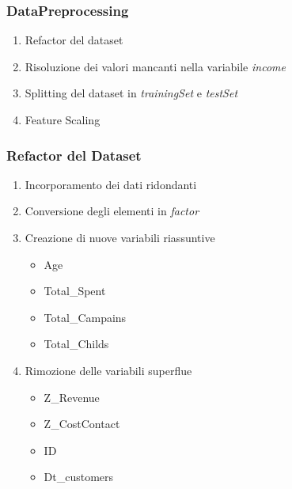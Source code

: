 \begin{frame}[fragile]
\frametitle{DataPreprocessing}
\begin{enumerate}
    \item Refactor del dataset
    \item Risoluzione dei valori mancanti nella variabile \textit{income}
    \item Splitting del dataset in \textit{trainingSet} e \textit{testSet}
    \item Feature Scaling
\end{enumerate}
\end{frame}
\begin{frame}[fragile]
\frametitle{Refactor del Dataset}
\begin{enumerate}
    \item Incorporamento dei dati ridondanti
    \item Conversione degli elementi in \textit{factor}
    \item Creazione di nuove variabili riassuntive
        \begin{itemize}
        \item Age
        \item Total\_Spent
        \item Total\_Campains
        \item Total\_Childs
    \end{itemize}
    \item Rimozione delle variabili superflue
    \begin{itemize}
        \item Z\_Revenue
        \item Z\_CostContact
        \item ID
        \item Dt\_customers
    \end{itemize}
\end{enumerate}
\end{frame}
